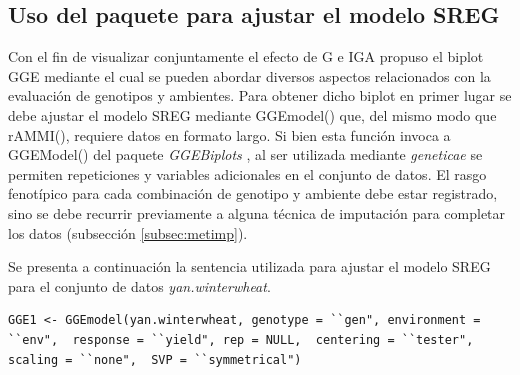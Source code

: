 \subsection{Uso del paquete para ajustar el modelo SREG}
\label{subsec:SREGpaquete}
Con el fin de visualizar conjuntamente el efecto de G e IGA \citet{Yanetal2000} propuso el biplot GGE mediante el cual se pueden abordar diversos aspectos relacionados con la evaluación de genotipos y ambientes. Para obtener dicho biplot en primer lugar se debe ajustar el modelo SREG mediante \textcolor{fandango}{GGEmodel()} que, del mismo modo que \textcolor{fandango}{rAMMI()}, requiere datos en formato largo. Si bien esta función invoca a \textcolor{fandango}{GGEModel()} del paquete \emph{GGEBiplots} \citep{Dumble2017}, al ser utilizada mediante \emph{geneticae} se permiten repeticiones y variables adicionales en el conjunto de datos. El rasgo fenotípico para cada combinación de genotipo y ambiente debe estar registrado, sino se debe recurrir previamente a alguna técnica de imputación para completar los datos (subsección \ref{subsec:metimp}). 

Se presenta a continuación la sentencia utilizada para ajustar el modelo SREG para el conjunto de datos \emph{yan.winterwheat}.

\begin{center}
\begin{tcolorbox}[colframe=aurometalsaurus,colback=backcolour,colbacklower=white,
   				width=1\linewidth,
    			height=0.12\linewidth,
    			boxsep=-3mm]
\begin{lstlisting}
GGE1 <- GGEmodel(yan.winterwheat, genotype = ``gen", environment = ``env",  response = ``yield", rep = NULL,  centering = ``tester", scaling = ``none",  SVP = ``symmetrical")
\end{lstlisting}
\end{tcolorbox}
\end{center}

